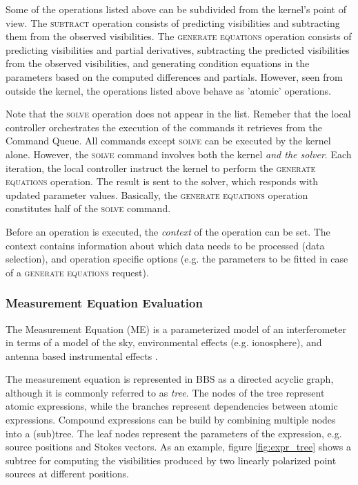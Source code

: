 \documentclass[10pt]{lofar}
\newcommand{\subtract}{\textsc{subtract}\xspace}
\newcommand{\solve}{\textsc{solve}\xspace}
\newcommand{\generate}{\textsc{generate equations}\xspace}
\begin{document}
Some of the operations listed above can be subdivided from the kernel's point of
view. The \subtract operation consists of predicting visibilities and
subtracting them from the observed visibilities. The \generate operation
consists of predicting visibilities and partial derivatives, subtracting the
predicted visibilities from the observed visibilities, and generating condition
equations in the parameters based on the computed differences and partials.
However, seen from outside the kernel, the operations listed above behave as
'atomic' operations.

Note that the \solve operation does not appear in the list. Remeber that the
local controller orchestrates the execution of the commands it retrieves from
the Command Queue. All commands except \solve can be executed by the kernel
alone. However, the \solve command involves both the kernel \emph{and the
solver}. Each iteration, the local controller instruct the kernel to perform the
\generate operation. The result is sent to the solver, which responds with
updated parameter values. Basically, the \generate operation constitutes half of
the \solve command.

Before an operation is executed, the \emph{context} of the operation can be set.
The context contains information about which data needs to be processed (data
selection), and operation specific options (e.g. the parameters to be fitted in
case of a \generate request).

\subsubsection{Measurement Equation Evaluation}
\label{subsubsec:design-me-evaluation}

The Measurement Equation (ME) is a parameterized model of an interferometer in
terms of a model of the sky, environmental effects (e.g. ionosphere), and
antenna based instrumental effects \cite{Hamaker1996-1, aips++note185,
LOFAR-ASTRON-ADD-015}.

The measurement equation is represented in BBS as a directed acyclic graph,
although it is commonly referred to as \emph{tree}. The nodes of the tree
represent atomic expressions, while the branches represent dependencies between
atomic expressions. Compound expressions can be build by combining multiple
nodes into a (sub)tree. The leaf nodes represent the parameters of the
expression, e.g. source positions and Stokes vectors. As an example, figure
\ref{fig:expr_tree} shows a subtree for computing the visibilities produced by
two linearly polarized point sources at different positions.
\end{document}
